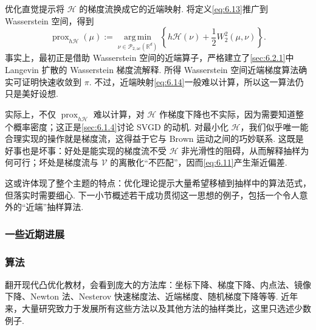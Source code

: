优化直觉提示将 $\mathcal H$ 的梯度流换成它的近端映射. 将定义\eqref{eq:6.13}推广到 Wasserstein 空间，得到
\begin{equation}\label{eq:6.14}
\operatorname{prox}_{h\mathcal H}(\mu):=
\operatorname*{arg\,min}_{\nu\in\mathcal P_{2,\mathrm{ac}}(\mathbb R^d)}
\left\{h\mathcal H(\nu)+\frac12W_2^2(\mu,\nu)\right\}.
\end{equation}
事实上，\cite{ref170}最初正是借助 Wasserstein 空间的近端算子，严格建立了\autoref{sec:6.2.1}中 Langevin 扩散的 Wasserstein 梯度流解释. 所得 Wasserstein 空间近端梯度算法确实可证明快速收敛到 $\pi$\cite{ref278}. 不过，近端映射\eqref{eq:6.14}一般难以计算，所以这一算法仍只是美好设想.

实际上，不仅 $\operatorname{prox}_{h\mathcal H}$ 难以计算，对 $\mathcal H$ 作梯度下降也不实际，因为需要知道整个概率密度；这正是\autoref{sec:6.1.4}讨论 SVGD 的动机. 对最小化 $\mathcal H$，我们似乎唯一能合理实现的操作就是梯度流，这得益于它与 Brown 运动之间的巧妙联系. 这既是好事也是坏事：好处是能实现的梯度流不受 $\mathcal H$ 非光滑性的阻碍，从而解释抽样为何可行；坏处是梯度流与 $\mathcal V$ 的离散化“不匹配”，因而\eqref{eq:6.11}产生渐近偏差.

这或许体现了整个主题的特点：优化理论提示大量希望移植到抽样中的算法范式，但落实时需要细心. 下一小节概述若干成功贯彻这一思想的例子，包括一个令人意外的“近端”抽样算法.

\subsubsection{一些近期进展}\label{sec:6.2.3}

\subsubsection*{算法}
翻开现代凸优化教材，会看到庞大的方法库：坐标下降、梯度下降、内点法、镜像下降、Newton 法、Nesterov 快速梯度法、近端梯度、随机梯度下降等等. 近年来，大量研究致力于发展所有这些方法以及其他方法的抽样类比，这里只选述少数例子.

